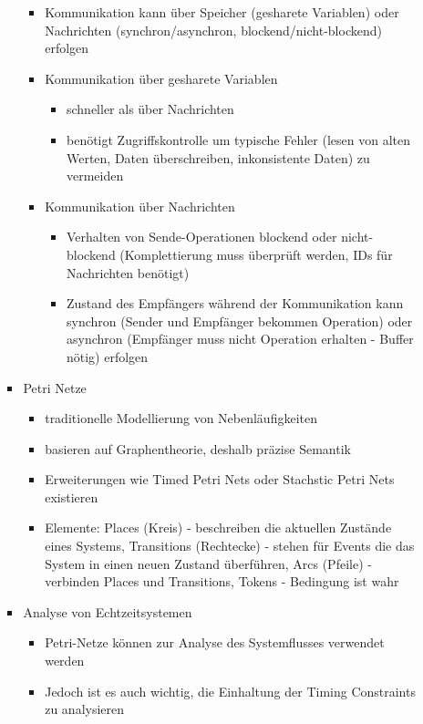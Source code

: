 \documentclass[paper=a4, fontsize=11pt]{scrartcl} %
\numberwithin{equation}{section} %
\numberwithin{figure}{section} %
\numberwithin{table}{section} %
\begin{document}
\begin{itemize}
\begin{itemize}
\begin{itemize}
      \begin{itemize}
        \item Kommunikation kann über Speicher (gesharete Variablen) oder Nachrichten (synchron/asynchron, blockend/nicht-blockend) erfolgen
        \item Kommunikation über gesharete Variablen
        \begin{itemize}
          \item schneller als über Nachrichten
          \item benötigt Zugriffskontrolle um typische Fehler (lesen von alten Werten, Daten überschreiben, inkonsistente Daten) zu vermeiden
        \end{itemize}
        \item Kommunikation über Nachrichten
        \begin{itemize}
          \item Verhalten von Sende-Operationen blockend oder nicht-blockend (Komplettierung muss überprüft werden, IDs für Nachrichten benötigt)
          \item Zustand des Empfängers während der Kommunikation kann synchron (Sender und Empfänger bekommen Operation) oder asynchron (Empfänger muss nicht Operation erhalten - Buffer nötig) erfolgen
        \end{itemize}
      \end{itemize}
      \item Petri Netze
      \begin{itemize}
        \item traditionelle Modellierung von Nebenläufigkeiten
        \item basieren auf Graphentheorie, deshalb präzise Semantik
        \item Erweiterungen wie Timed Petri Nets oder Stachstic Petri Nets existieren
        \item Elemente: Places (Kreis) - beschreiben die aktuellen Zustände eines Systems, Transitions (Rechtecke) - stehen für Events die das System in einen neuen Zustand überführen, Arcs (Pfeile) - verbinden Places und Transitions, Tokens - Bedingung ist wahr
      \end{itemize}
      \item Analyse von Echtzeitsystemen
      \begin{itemize}
        \item Petri-Netze können zur Analyse des Systemflusses verwendet werden
        \item Jedoch ist es auch wichtig, die Einhaltung der Timing Constraints zu analysieren

\end{itemize}
\end{itemize}
\end{itemize}
\end{itemize}
\end{document}
